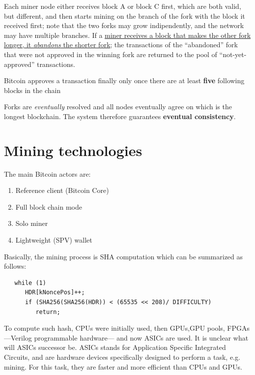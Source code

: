 Each miner node either receives block A or block C first, which are both valid, but different,
and then starts mining on the branch of the fork with the block it received first;
note that the two forks may grow indipendently, and the network may have multiple branches.
If a \ul{miner receives a block that makes the other fork longer, it \textit{abandons} the
shorter fork};
the transactions of the ``abandoned'' fork that were not approved in the winning fork are returned to the pool of ``not-yet-approved'' transactions.
\begin{definition}
   \label{def:6confirmation}
   Bitcoin approves a transaction finally only once there are at least \textbf{five} following blocks in the chain 
\end{definition}


\begin{definition}
   Forks are \textit{eventually} resolved and all nodes eventually agree on which is the longest
   blockchain. The system therefore guarantees \textbf{eventual consistency}.
\end{definition}

\section{Mining technologies}
The main Bitcoin actors are:
\begin{enumerate}
   \item Reference client (Bitcoin Core)
   \item Full block chain mode
   \item Solo miner
   \item Lightweight (SPV) wallet
\end{enumerate}

Basically, the mining process is SHA computation which can be summarized as follows:
\begin{lstlisting}
   while (1)
      HDR[kNoncePos]++;
      if (SHA256(SHA256(HDR)) < (65535 << 208)/ DIFFICULTY)
         return;
\end{lstlisting}
To compute such hash, CPUs were initially used, then GPUs,GPU pools, FPGAs ---Verilog programmable hardware--- and now ASICs are used.
It is unclear what will ASICs successor be.
ASICs stands for Application Specific Integrated Circuits, and are hardware devices specifically designed to perform a task, e.g. mining.
For this task, they are faster and more efficient than CPUs and GPUs.

